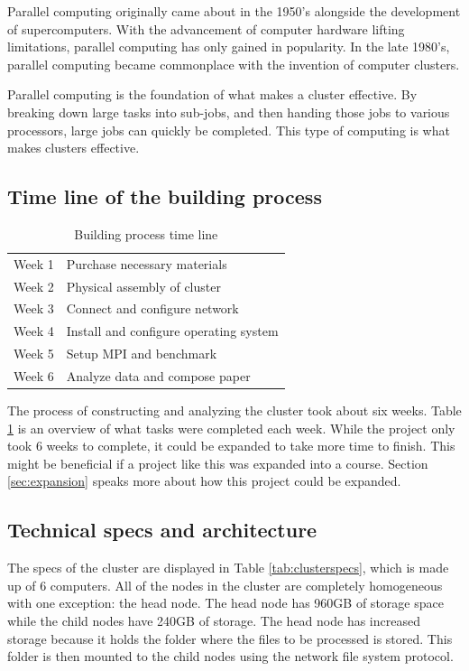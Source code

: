 \documentclass[12pt]{article}
\begin{document}
Parallel computing originally came about in the 1950's alongside the development of supercomputers. With the advancement of computer hardware lifting limitations, parallel computing has only gained in popularity. In the late 1980's, parallel computing became commonplace with the invention of computer clusters. 

Parallel computing is the foundation of what makes a cluster effective. By breaking down large tasks into sub-jobs, and then handing those jobs to various processors, large jobs can quickly be completed. This type of computing is what makes clusters effective.


\subsection{Time line of the building process}
\begin{table} [htb!]
    \centering
    \begin{tabular}{ll}
        Week 1 & Purchase necessary materials   \\
        Week 2 & Physical assembly of cluster   \\
        Week 3 & Connect and configure network  \\
        Week 4 & Install and configure operating system \\
        Week 5 & Setup MPI and benchmark    \\
        Week 6 & Analyze data and compose paper    \\
    \end{tabular}
    \caption{Building process time line}
    \label{tab:timeline}
    
\end{table}

The process of constructing and analyzing the cluster took about six weeks. Table \ref{tab:timeline} is an overview of what tasks were completed each week. While the project only took 6 weeks to complete, it could be expanded to take more time to finish. This might be beneficial if a project like this was expanded into a course. Section \ref{sec:expansion} speaks more about how this project could be expanded.

\subsection{Technical specs and architecture}

The specs of the cluster are displayed in Table \ref{tab:clusterspecs}, which is made up of 6 computers. All of the nodes in the cluster are completely homogeneous with one exception: the head node. The head node has 960GB of storage space while the child nodes have 240GB of storage. The head node has increased storage because it holds the folder where the files to be processed is stored. This folder is then mounted to the child nodes using the network file system protocol.
\end{document}
